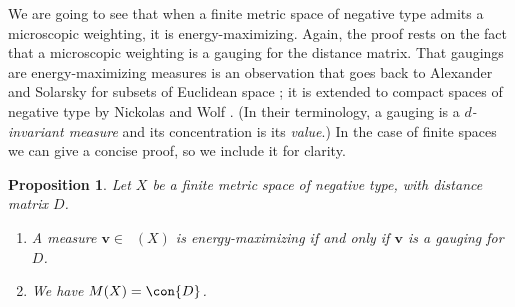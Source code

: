 \documentclass[a4paper, oneside, reqno]{amsart}
\newtheorem{prop}[theorem]{Proposition}
\theoremstyle{definition}
\theoremstyle{remark}
\numberwithin{equation}{section}
\newcommand{\demph}[1]{\emph{#1}}
\renewcommand{\vec}{\mathbf}
\DeclareMathOperator{\measmassone}{\mathcal{M}_1}
\begin{document}
We are going to see that when a finite metric space of negative type admits a microscopic weighting, it is energy-maximizing. Again, the proof rests on the fact that a microscopic weighting is a gauging for the distance matrix. That gaugings are energy-maximizing measures is an observation that goes back to Alexander and Solarsky for subsets of Euclidean space \cite[Theorem~3.3]{Alexander-Stolarsky:Extremal-problems}; it is extended to compact spaces of negative type by Nickolas and Wolf \cite[Theorem~3.1]{Nickolas-Wolf:distance-geometry-II}. (In their terminology, a gauging is a \demph{\(d\)-invariant measure} and its concentration is its \demph{value}.) In the case of finite spaces we can give a concise proof, so we include it for clarity.

\begin{prop}
\label{prop:maximal-distance-energy}
    Let \(X\) be a finite metric space of negative type, with distance matrix \(D\).
    \begin{enumerate}
        \item \label{part:maximal-distance-energy-2} A measure \(\vec{v}\in \measmassone(X)\) is energy-maximizing if and only if \(\vec{v}\) is a gauging for \(D\).
        \item \label{part:maximal-distance-energy-3} We have \(M(X) = \con{D}\).
    \end{enumerate}
\end{prop}
\end{document}
